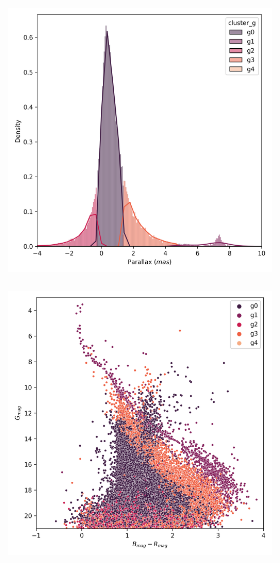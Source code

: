 \documentclass[11pt,a4paper,english,twocolumn]{article}
\begin{document}
\begin{figure}[htbp]
\begin{subfigure}{\columnwidth}
\begin{subfigure}[t]{0.30\textwidth}
    \end{subfigure}
    \hfill
    \begin{subfigure}[t]{0.30\textwidth}
      \centering
      \includegraphics[width=\textwidth]{../figures/melotte_22/kmeans_parallax_melotte_22.png}
    \end{subfigure}
    \hfill
    \begin{subfigure}[t]{0.30\textwidth}
      \centering
      \includegraphics[width=\textwidth]{../figures/melotte_22/kmeans_hr_diagram_melotte_22.png}

\end{subfigure}
\end{subfigure}
\end{figure}
\end{document}
